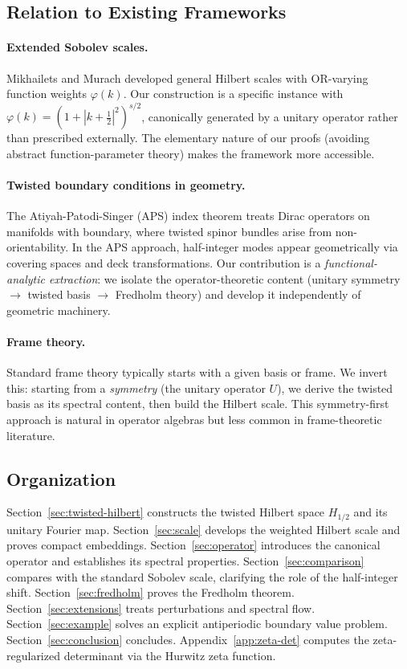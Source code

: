 \documentclass[11pt]{amsart}
\theoremstyle{definition}
\theoremstyle{remark}
\begin{document}
\subsection*{Relation to Existing Frameworks}

\paragraph{Extended Sobolev scales.}
Mikhailets and Murach \cite{mikhailets-murach} developed general Hilbert scales with OR-varying function weights $\varphi(k)$. Our construction is a specific instance with $\varphi(k)=(1+|k+\tfrac{1}{2}|^2)^{s/2}$, canonically generated by a unitary operator rather than prescribed externally. The elementary nature of our proofs (avoiding abstract function-parameter theory) makes the framework more accessible.

\paragraph{Twisted boundary conditions in geometry.}
The Atiyah-Patodi-Singer (APS) index theorem \cite{atiyah-patodi-singer} treats Dirac operators on manifolds with boundary, where twisted spinor bundles arise from non-orientability. In the APS approach, half-integer modes appear geometrically via covering spaces and deck transformations. Our contribution is a \emph{functional-analytic extraction}: we isolate the operator-theoretic content (unitary symmetry $\to$ twisted basis $\to$ Fredholm theory) and develop it independently of geometric machinery.

\paragraph{Frame theory.}
Standard frame theory \cite{christensen} typically starts with a given basis or frame. We invert this: starting from a \emph{symmetry} (the unitary operator $U$), we derive the twisted basis as its spectral content, then build the Hilbert scale. This symmetry-first approach is natural in operator algebras but less common in frame-theoretic literature.

\subsection*{Organization}

Section~\ref{sec:twisted-hilbert} constructs the twisted Hilbert space $H_{1/2}$ and its unitary Fourier map. Section~\ref{sec:scale} develops the weighted Hilbert scale and proves compact embeddings. Section~\ref{sec:operator} introduces the canonical operator and establishes its spectral properties. Section~\ref{sec:comparison} compares with the standard Sobolev scale, clarifying the role of the half-integer shift. Section~\ref{sec:fredholm} proves the Fredholm theorem. Section~\ref{sec:extensions} treats perturbations and spectral flow. Section~\ref{sec:example} solves an explicit antiperiodic boundary value problem. Section~\ref{sec:conclusion} concludes. Appendix~\ref{app:zeta-det} computes the zeta-regularized determinant via the Hurwitz zeta function.
\end{document}
